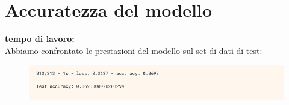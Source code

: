 \section{Accuratezza del modello}
\textbf{tempo di lavoro:} \\
\newline
Abbiamo confrontato le prestazioni del modello sul set di dati di test:

\begin{figure}[H]
	\centering
	\includegraphics[scale=0.70]{./images/img6.png}
\end{figure}